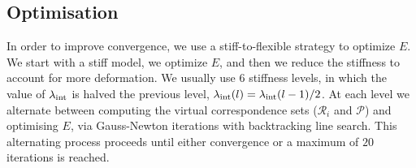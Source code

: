 \subsection{Optimisation}
In order to improve convergence, we use a stiff-to-flexible strategy to optimize $E$. We start with a stiff model, we optimize $E$, and then we reduce the stiffness to account for more deformation.
We usually use $6$ stiffness levels, in which the value of $\lambda_{\text{int}}$ is halved \wrt the previous level, \ie $\lambda_{\text{int}}(l)=\lambda_{\text{int}}(l-1)/2$.
At each level we alternate between computing the virtual correspondence sets ($\mathcal{R}_i$ and $\mathcal{P}$) and optimising $E$, via Gauss-Newton iterations with backtracking line search.
This alternating process proceeds until either convergence or a maximum of $20$ iterations is reached.
